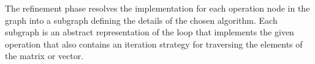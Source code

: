 \documentclass[runningheads]{llncs}
\begin{document}

The refinement phase resolves the implementation for each operation node in
the graph into a subgraph defining the details of the chosen algorithm.  Each
subgraph is an abstract representation of the loop that implements the given
operation that also contains an iteration strategy for traversing the
elements of the matrix or vector.

%




\end{document}
